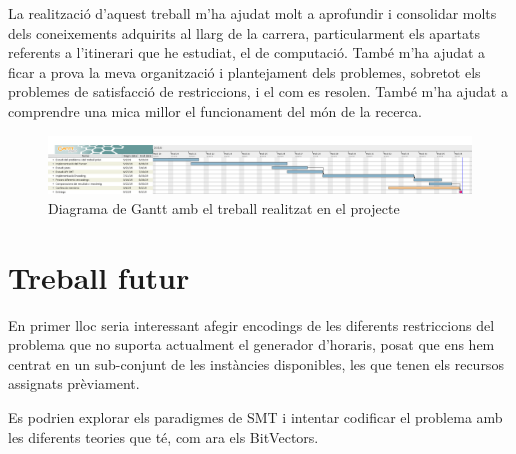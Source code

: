 \documentclass[11pt,a4paper,twoside]{report}
\begin{document}
  La realització d'aquest treball m'ha ajudat molt a aprofundir i consolidar molts dels coneixements adquirits al llarg de la carrera, particularment els apartats referents a l'itinerari que he estudiat, el de computació. 
  També m'ha ajudat a ficar a prova la meva organització i plantejament dels problemes, sobretot els problemes de satisfacció de restriccions, i el com es resolen. 
  També m'ha ajudat a comprendre una mica millor el funcionament del món de la recerca. 


  \begin{figure}
    \centering
    \includegraphics[angle=90,origin=c,height=0.58\textheight]{Diagrames/gantt2.png} 
    \caption{Diagrama de Gantt amb el treball realitzat en el projecte}
    \label{fig:Gantt2}
  \end{figure}
 



  
  





  \chapter{Treball futur}

  En primer lloc seria interessant afegir encodings de les diferents restriccions del problema que no suporta actualment el generador d'horaris, posat que ens hem centrat en un sub-conjunt de les instàncies disponibles, les que tenen els recursos assignats prèviament.

  Es podrien explorar els paradigmes de SMT i intentar codificar el problema amb les diferents teories que té, com ara els BitVectors.
\end{document}
